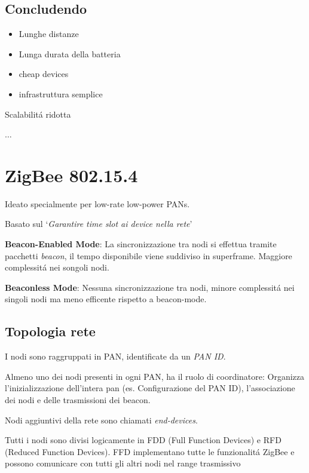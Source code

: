 \documentclass{article}
\begin{document}

\subsection{Concludendo}

\begin{itemize}
    \item Lunghe distanze
    \item Lunga durata della batteria
    \item cheap devices
    \item infrastruttura semplice
\end{itemize}

Scalabilit\'a ridotta

$\ldots$
\section{ZigBee 802.15.4}
Ideato specialmente per low-rate low-power PANs.

Basato sul `\textit{Garantire time slot ai device nella rete}'


\textbf{Beacon-Enabled Mode}: La sincronizzazione tra nodi si effettua tramite pacchetti \textit{beacon}, il tempo disponibile viene suddiviso in superframe. Maggiore complessit\'a nei songoli nodi.

\textbf{Beaconless Mode}: Nessuna sincronizzazione tra nodi, minore complessit\'a nei singoli nodi ma meno efficente rispetto a beacon-mode.

\subsection{Topologia rete}
I nodi sono raggruppati in PAN, identificate da un \textit{PAN ID}.

Almeno uno dei nodi presenti in ogni PAN, ha il ruolo di coordinatore: Organizza l'inizializzazione dell'intera pan (es. Configurazione del PAN ID), l'associazione dei nodi e delle trasmissioni dei beacon.

Nodi aggiuntivi della rete sono chiamati \textit{end-devices}.

Tutti i nodi sono divisi logicamente in FDD (Full Function Devices) e RFD (Reduced Function Devices). FFD implementano tutte le funzionalit\'a ZigBee e possono comunicare con tutti gli altri nodi nel range trasmissivo
\end{document}
